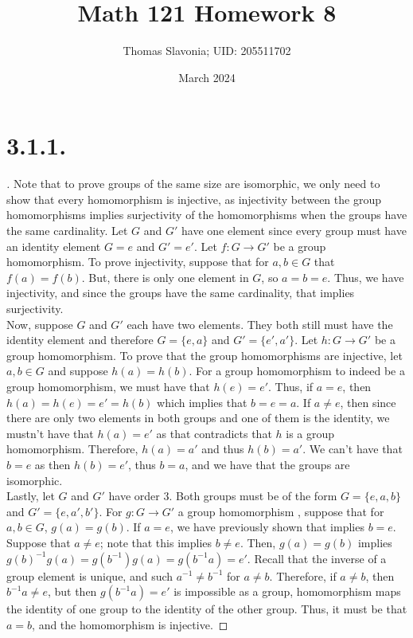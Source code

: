 \documentclass{article}
\title{Math 121 Homework 8}
\author{Thomas Slavonia; UID: 205511702}
\date{March 2024}
\begin{document}
\maketitle
\section*{3.1.1.}
\begin{proof}[\unskip\nopunct]
    Note that to prove groups of the same size are isomorphic, we only need to show that every homomorphism is injective, as injectivity between the group homomorphisms implies surjectivity of the homomorphisms when the groups have the same cardinality.  
    Let $G$ and $G'$ have one element since every group must have an identity element $G = e$ and $G' = e'$. Let $f:G \to G'$ be a group homomorphism. 
    To prove injectivity, suppose that for $a, b \in G$ that $f(a) = f(b)$. But, there is only one element in $G$, so $a = b = e$. 
    Thus, we have injectivity, and since the groups have the same cardinality, that implies surjectivity. \\
    Now, suppose $G$ and $G'$ each have two elements. They both still must have the identity element and therefore $G = \{e, a\}$ and $G' = \{e', a'\}$. 
    Let $h: G \to G'$ be a group homomorphism. To prove that the group homomorphisms are injective, let $a, b \in G$ and suppose $h(a) = h(b)$. 
    For a group homomorphism to indeed be a group homomorphism, we must have that $h(e) = e'$. Thus, if $a = e$, then $h(a) = h(e) = e' = h(b)$ which implies that $b = e = a$. If $a \neq e$, then since there are only two elements in both groups and one of them is the identity, we mustn't have that $h(a) = e'$ as that contradicts that $h$ is a group homomorphism. Therefore, $h(a) = a'$ and thus $h(b) = a'$. 
    We can't have that $b = e$ as then $h(b) = e'$, thus $b = a$, and we have that the groups are isomorphic. \\
    Lastly, let $G$ and $G'$ have order $3$. Both groups must be of the form $G = \{e , a, b\}$ and $G' = \{e, a', b' \}$. For $g: G \to G'$ a group homomorphism 
    , suppose that for $a, b \in G$, $g(a) = g(b)$. If $a = e$, we have previously shown that implies $b = e$. Suppose that $a \neq e$; note that this implies $b \neq e$. 
    Then, $g(a) = g(b)$ implies $g(b)^{-1}g(a) = g(b^{-1})g(a) = g(b^{-1}a) = e'$. Recall that the inverse of a group element is unique, and such $a^{-1} \neq b^{-1}$ for $a \neq b$. Therefore, if $a \neq b$, then $b^{-1}a \neq e$, but then $g(b^{-1}a) = e'$ is impossible
    as a group, homomorphism maps the identity of one group to the identity of the other group. 
    Thus, it must be that $a = b$, and the homomorphism is injective. 

\end{proof}
\end{document}
